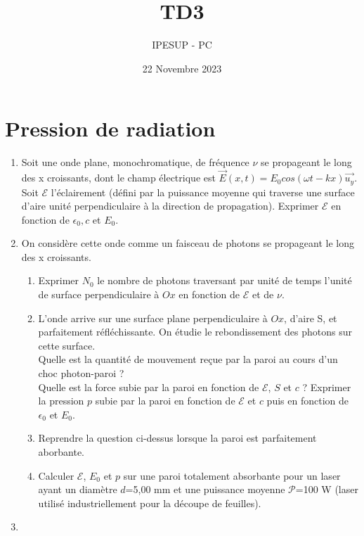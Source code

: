 \documentclass{article}
\title{TD3}
\author{IPESUP - PC }
\date{22 Novembre 2023}
\begin{document}
\maketitle



\section{Pression de radiation}

\begin{enumerate}
    \item Soit une onde plane, monochromatique, de fréquence $\nu$ se propageant le long des x croissants, dont le champ électrique est $\vec{E}(x,t)=E_0cos(\omega t-kx)\vec{u_y}$. Soit  $\mathcal{E}$ l'éclairement (défini par la puissance moyenne qui traverse une surface d'aire unité perpendiculaire à la direction de propagation). Exprimer $\mathcal{E}$ en fonction de $\epsilon_0, c $ et $E_0$. 
    \item On considère cette onde comme un faisceau de photons se propageant le long des x croissants. 
    \begin{enumerate}
        \item Exprimer $N_0$ le nombre de photons traversant par unité de temps l'unité de surface perpendiculaire à $Ox$ en fonction de $\mathcal{E}$ et de $\nu$. 
        \item L'onde arrive sur une surface plane perpendiculaire à $Ox$, d'aire S, et parfaitement réfléchissante. On étudie le rebondissement des photons sur cette surface. 
        \\
        Quelle est la quantité de mouvement reçue par la paroi au cours d'un choc photon-paroi ? \\
        Quelle est la force subie par la paroi en fonction de $\mathcal{E}$, $S$ et $c$ ? 
        Exprimer la pression $p$ subie par la paroi en fonction de $\mathcal{E}$ et $c$ puis en fonction de $\epsilon_0$ et $E_0$. 
        \item Reprendre la question ci-dessus lorsque la paroi est parfaitement aborbante. 
        \item Calculer $\mathcal{E}$, $E_0$ et $p$ sur une paroi totalement absorbante pour un laser ayant un diamètre $d$=5,00 mm et une puissance moyenne $\mathcal{P}$=100 W (laser utilisé industriellement pour la découpe de feuilles). 
    \end{enumerate}
    \item 
    \begin{enumerate} 

\end{enumerate}
\end{enumerate}
\end{document}
